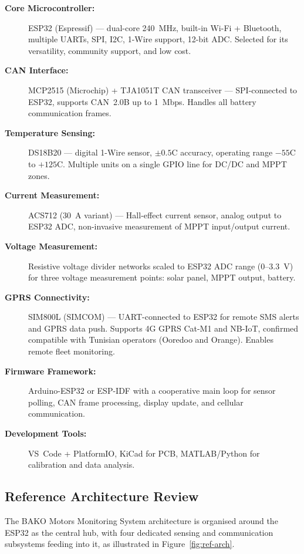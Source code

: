 \begin{description}
    \item[\textbf{Core Microcontroller:}] ESP32 (Espressif) --- dual-core 240~MHz, built-in Wi-Fi + Bluetooth, multiple UARTs, SPI, I2C, 1-Wire support, 12-bit ADC. Selected for its versatility, community support, and low cost.

    \item[\textbf{CAN Interface:}] MCP2515 (Microchip) + TJA1051T CAN transceiver --- SPI-connected to ESP32, supports CAN~2.0B up to 1~Mbps. Handles all battery communication frames.

    \item[\textbf{Temperature Sensing:}] DS18B20 --- digital 1-Wire sensor, $\pm 0.5$\textdegree{}C accuracy, operating range $-55$\textdegree{}C to $+125$\textdegree{}C. Multiple units on a single GPIO line for DC/DC and MPPT zones.

    \item[\textbf{Current Measurement:}] ACS712 (30~A variant) --- Hall-effect current sensor, analog output to ESP32 ADC, non-invasive measurement of MPPT input/output current.

    \item[\textbf{Voltage Measurement:}] Resistive voltage divider networks scaled to ESP32 ADC range (0--3.3~V) for three voltage measurement points: solar panel, MPPT output, battery.

    \item[\textbf{GPRS Connectivity:}] SIM800L (SIMCOM) --- UART-connected to ESP32 for remote SMS alerts and GPRS data push. Supports 4G GPRS Cat-M1 and NB-IoT, confirmed compatible with Tunisian operators (Ooredoo and Orange). Enables remote fleet monitoring.

    \item[\textbf{Firmware Framework:}] Arduino-ESP32 or ESP-IDF with a cooperative main loop for sensor polling, CAN frame processing, display update, and cellular communication.

    \item[\textbf{Development Tools:}] VS~Code + PlatformIO, KiCad for PCB, MATLAB/Python for calibration and data analysis.
\end{description}

\subsection{Reference Architecture Review}

The BAKO Motors Monitoring System architecture is organised around the ESP32 as the central hub, with four dedicated sensing and communication subsystems feeding into it, as illustrated in Figure~\ref{fig:ref-arch}.

